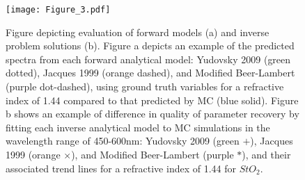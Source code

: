 \begin{figure}[htbp]
    \centering
    \texttt{[image: Figure\_3.pdf]}
    \caption{Figure depicting evaluation of forward models (a) and inverse problem solutions (b). 
    Figure a depicts an example of the predicted spectra from each forward analytical model: Yudovsky 2009 (\textcolor{MyGreen}{green dotted}), Jacques 1999 (\textcolor{MyOrange}{orange dashed}), and Modified Beer-Lambert (\textcolor{MyPurple}{purple dot-dashed}), using ground truth variables for a refractive index of 1.44 compared to that predicted by MC (\textcolor{MyBlue}{blue solid}).
    Figure b shows an example of difference in quality of parameter recovery by fitting each inverse analytical model to MC simulations in the wavelength range of 450-600nm: Yudovsky 2009 (\textcolor{MyGreen}{green $+$}), Jacques 1999 (\textcolor{MyOrange}{orange $\times$}), and Modified Beer-Lambert (\textcolor{MyPurple}{purple $*$}), and their associated trend lines for a refractive index of 1.44 for $StO_2$.}
    \label{fig:FwDandInverse}
\end{figure}

